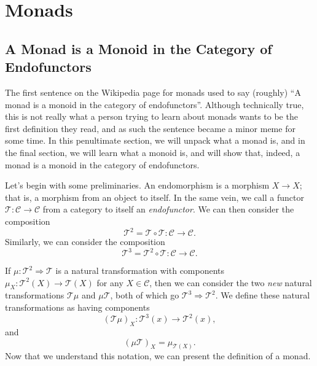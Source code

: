 \section{Monads}

\subsection{A Monad is a Monoid in the Category of Endofunctors}
The first sentence on the Wikipedia page for monads used to say (roughly) ``A monad is a monoid in the category of endofunctors''. Although technically true, this is not really what a person trying to learn about monads wants to be the first definition they read, and as such the sentence became a minor meme for some time. In this penultimate section, we will unpack what a monad is, and in the final section, we will learn what a monoid is, and will show that, indeed, a monad is a monoid in the category of endofunctors.

Let's begin with some preliminaries. An endomorphism is a morphism $X\to X$; that is, a morphism from an object to itself. In the same vein, we call a functor $\mathcal{T} : \mathcal{C}  \to \mathcal{C} $ from a category to itself an \emph{endofunctor}. We can then consider the composition
\[
	\mathcal{T} ^2 =  \mathcal{T} \circ \mathcal{T} : \mathcal{C}  \to \mathcal{C} 
.\]
Similarly, we can consider the composition
\[
	\mathcal{T} ^3=\mathcal{T} ^2\circ \mathcal{T} : \mathcal{C}  \to \mathcal{C} 
.\]

If $\mu : \mathcal{T} ^2 \Rightarrow \mathcal{T} $ is a natural transformation with components $\mu_X : \mathcal{T} ^2(X) \to \mathcal{T} (X)$ for any $X\in \mathcal{C} $, then we can consider the two \emph{new} natural transformations $\mathcal{T} \mu $ and $\mu \mathcal{T} $, both of which go $\mathcal{T} ^3 \Rightarrow \mathcal{T} ^2$. We define these natural transformations as having components
\[
	\left(\mathcal{T} \mu\right)_X : \mathcal{T} ^3(x) \to \mathcal{T} ^2(x),
\]
and
\[
	\left( \mu \mathcal{T}  \right)_X = \mu_{\mathcal{T} (X)} 
.\]
Now that we understand this notation, we can present the definition of a monad.

